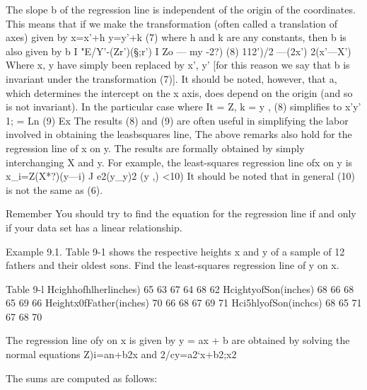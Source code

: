 The slope b of the regression line is independent of the origin of the
coordinates. This means that if we make the transformation (often
called a translation of axes) given by
x=x'+h y=y'+k (7)
where h and k are any constants, then b is also given by
b I "E/Y’-(Zr’)(§;r’) I Zo — my -2?) (8)
112')/2 —(2x’) 2(x'—X')
Where x, y have simply been replaced by x’, y’ [for this reason we say
that b is invariant under the transformation (7)]. It should be noted,
however, that a, which determines the intercept on the x axis, does
depend on the origin (and so is not invariant).
In the particular case where It = Z, k = y , (8) simpliﬁes to
x'y’
1; = Ln (9)
Ex
The results (8) and (9) are often useful in simplifying the labor
involved in obtaining the leasbsquares line,
The above remarks also hold for the regression line of x on y. The
results are formally obtained by simply interchanging X and y. For
example, the least-squares regression line ofx on y is
x_i=Z(X*?)(y—i) J
e2(y_y)2 (y ,) <10)
It should be noted that in general (10) is not the same as (6).


Remember
You should try to ﬁnd the equation for the regression line if and only if your data set has a linear relationship.

Example 9.1. Table 9-1 shows the respective heights x and y of a sample of 12 fathers and their oldest sons. Find the least-squares regression line of y on x.

Table 9-l
Hcighhofhlherlinches) 65 63 67 64 68 62
HcightyofSon(inches) 68 66 68 65 69 66
Heightx0fFather(inches) 70 66 68 67 69 71
Hci5hlyofSon(inchcs) 68 65 71 67 68 70

The regression line ofy on x is given by y = ax + b are obtained by solving the normal equations
Z)i=an+b2x and 2/cy=a2‘x+b2;x2

The sums are computed as follows:



